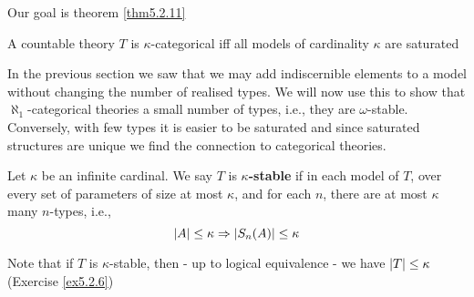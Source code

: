 \documentclass[11pt]{article}
\begin{document}
Our goal is theorem \ref{thm5.2.11}
\begin{theorem}[]
A countable theory \(T\) is \(\kappa\)-categorical iff all models of cardinality \(\kappa\) are saturated
\end{theorem}

\begin{center}\end{center}


In the previous section we saw that we may add indiscernible elements to a model without
changing the number of realised types. We will now use this to show that \(\aleph_1\)-categorical
theories a small number of types, i.e., they are \(\omega\)-stable. Conversely, with few types it is
easier to be saturated and since saturated structures are unique we find the connection to
categorical theories.

\begin{definition}[]
Let \(\kappa\) be an infinite cardinal. We say \(T\) is \textbf{\(\kappa\)-stable} if in each model of \(T\), over
every set of parameters of size at most \(\kappa\), and for each \(n\), there are at most \(\kappa\)
many \(n\)-types, i.e.,
\begin{equation*}
\abs{A}\le\kappa\Rightarrow\abs{S_n(A)}\le\kappa
\end{equation*}
\end{definition}

Note that if \(T\) is \(\kappa\)-stable, then - up to logical equivalence - we have \(\abs{T}\le\kappa\)
(Exercise \ref{ex5.2.6})
\end{document}
